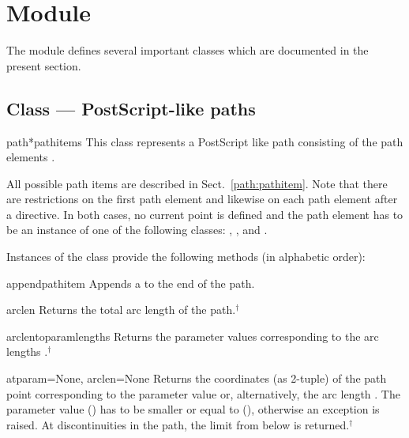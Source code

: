 \section{Module }


\label{path}

The  module defines several important classes which are
documented in the present section.

\subsection{Class  --- PostScript-like paths}

\label{path:path}


\begin{classdesc}{path}{*pathitems}
This class represents a PostScript like path consisting of the
path elements .

All possible path items are described in Sect.~\ref{path:pathitem}.
Note that there are restrictions on the first path element and likewise
on each path element after a  directive. In both cases,
no current point is defined and the path element has to be an instance
of one of the following classes: , , and
.
\end{classdesc}

Instances of the class  provide the following
methods (in alphabetic order):

\begin{methoddesc}{append}{pathitem}
Appends a  to the end of the path.
\end{methoddesc}

\begin{methoddesc}{arclen}{}
Returns the total arc length of the path.$^\dagger$
\end{methoddesc}

\begin{methoddesc}{arclentoparam}{lengths}
  Returns the parameter values corresponding to the arc lengths
  .$^\dagger$
\end{methoddesc}

\begin{methoddesc}{at}{param=None, arclen=None}
  Returns the coordinates (as 2-tuple) of the path point corresponding to the
  parameter value  or, alternatively, the arc length
  . The parameter value  () has to be smaller
  or equal to  (),
  otherwise an exception is raised.  At discontinuities in the path,
  the limit from below is returned.$^\dagger$
\end{methoddesc}

